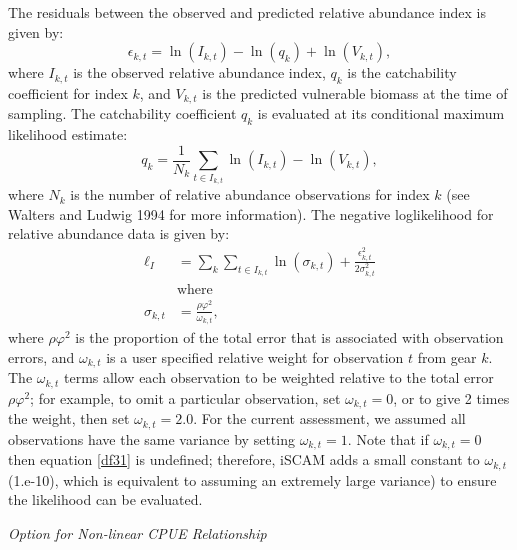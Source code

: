 \documentclass[11pt]{article}   %
\begin{document}
The residuals between the observed and predicted relative abundance index is given by:
\begin{equation}\label{df30}
\epsilon_{k,t} = \ln(I_{k,t}) - \ln(q_k)+\ln(V_{k,t}),
\end{equation}
where $I_{k,t}$ is the observed relative abundance index, $q_k$ is the catchability coefficient for index $k$, and $V_{k,t}$ is the predicted vulnerable biomass at the time of sampling.  The catchability coefficient $q_k$ is evaluated at its conditional maximum likelihood estimate:
\[
  q_k =\frac{1}{N_k} \sum_{t \in I_{k,t}} \ln(I_{k,t}) - \ln(V_{k,t}),
\]
where $N_k$ is the number of relative abundance observations for index $k$ (see Walters and Ludwig 1994 for more information). The negative loglikelihood for relative abundance data is given by:
\begin{align}
\ell_I &= \sum_k \sum_{t \in I_{k,t}}  \ln(\sigma_{k,t})+\frac{\epsilon_{k,t}^2}{2\sigma_{k,t}^2} \label{df31}\\
&\mbox{where}\nonumber\\
\sigma_{k,t} &= \frac{\rho \varphi^2}{ \omega_{k,t}},  \nonumber
\end{align}
where $\rho \varphi^2$ is the proportion of the total error that is associated with observation errors, and $\omega_{k,t}$ is a user specified relative weight for observation $t$ from gear $k$.  The $ \omega_{k,t}$ terms allow each observation to be weighted relative to the total error $\rho \varphi^2$; for example, to omit a particular observation, set $\omega_{k,t}=0$, or to give 2 times the weight, then set  $\omega_{k,t}=2.0$. For the current assessment, we assumed all observations have the same variance by setting  $\omega_{k,t}=1$.  Note that if  $\omega_{k,t}=0$ then equation \eqref{df31} is undefined; therefore, iSCAM adds a small constant to  $\omega_{k,t}$ (1.e-10), which is equivalent to assuming an extremely large variance)  to ensure the likelihood can be evaluated.

\vspace{2ex}
\textit{Option for Non-linear CPUE Relationship}
\end{document}

